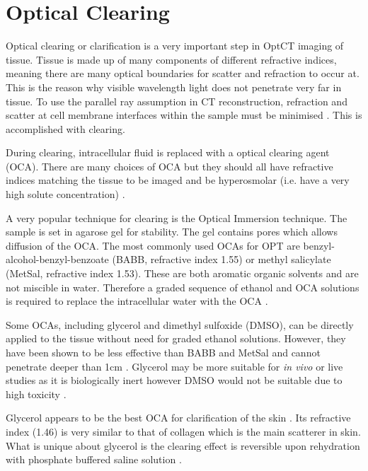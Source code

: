 \documentclass[12pt]{article}
\begin{document}
\section{Optical Clearing}
\label{sec:clearing}

Optical clearing or clarification is a very important step in OptCT imaging of tissue. Tissue is made up of many components of different refractive indices, meaning there are many optical boundaries for scatter and refraction to occur at. This is the reason why visible wavelength light does not penetrate very far in tissue. To use the parallel ray assumption  in CT reconstruction, refraction and scatter at cell membrane interfaces within the sample must be minimised \cite{Oldham:2006}.  This is accomplished with clearing.

During clearing, intracellular  fluid is replaced with a optical clearing agent (OCA). There are many choices of OCA but they should all have refractive indices matching the tissue to be imaged and be hyperosmolar (i.e. have a very high solute concentration) \cite{tuchin2007tissue}.
 
 
A very popular technique for clearing is the Optical Immersion technique. The sample is set in agarose gel for stability. The gel contains pores which allows diffusion of the OCA. The most commonly used OCAs for OPT are benzyl-alcohol-benzyl-benzoate (BABB, refractive index 1.55) or methyl salicylate (MetSal, refractive index 1.53). These are both aromatic organic solvents and are not miscible in water. Therefore a graded sequence of ethanol and OCA solutions is required to replace the intracellular water with the OCA \cite{Oldham:2006}. 

Some OCAs, including glycerol and dimethyl sulfoxide (DMSO), can be directly applied to the tissue without need for graded ethanol solutions. However, they have been shown to be less effective than BABB and MetSal and cannot penetrate deeper than 1cm \cite{Oldham:2006}.  Glycerol may be more suitable for \textit{in vivo} or live studies as it is biologically inert however DMSO would not be suitable due to high toxicity \cite{Wen:2009is}.


Glycerol appears to be the best OCA for clarification of the skin \cite{Vargas:1999, Wen:2009is}. Its refractive index (1.46) is very similar to that of collagen which is the main scatterer in skin. What is unique about glycerol is the clearing effect is reversible upon rehydration with phosphate buffered saline solution \cite{Vargas:1999}. 
\end{document}

